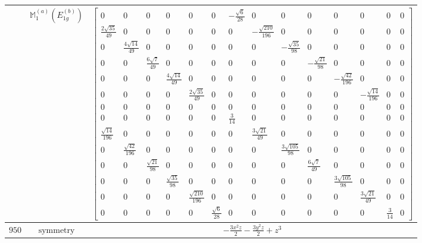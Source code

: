 \documentclass[fleqn,8pt,landscape]{jsarticle}
\begin{document}
\begin{longtable}{ccc}
$  $ & $ \mathbb{M}_{1}^{(a)}(E_{1g}^{(b)}) $ & $ \begin{bmatrix} 0 & 0 & 0 & 0 & 0 & 0 & - \frac{\sqrt{6}}{28} & 0 & 0 & 0 & 0 & 0 & 0 & 0 \\ \frac{2 \sqrt{35}}{49} & 0 & 0 & 0 & 0 & 0 & 0 & - \frac{\sqrt{210}}{196} & 0 & 0 & 0 & 0 & 0 & 0 \\ 0 & \frac{4 \sqrt{14}}{49} & 0 & 0 & 0 & 0 & 0 & 0 & - \frac{\sqrt{35}}{98} & 0 & 0 & 0 & 0 & 0 \\ 0 & 0 & \frac{6 \sqrt{7}}{49} & 0 & 0 & 0 & 0 & 0 & 0 & - \frac{\sqrt{21}}{98} & 0 & 0 & 0 & 0 \\ 0 & 0 & 0 & \frac{4 \sqrt{14}}{49} & 0 & 0 & 0 & 0 & 0 & 0 & - \frac{\sqrt{42}}{196} & 0 & 0 & 0 \\ 0 & 0 & 0 & 0 & \frac{2 \sqrt{35}}{49} & 0 & 0 & 0 & 0 & 0 & 0 & - \frac{\sqrt{14}}{196} & 0 & 0 \\ 0 & 0 & 0 & 0 & 0 & 0 & 0 & 0 & 0 & 0 & 0 & 0 & 0 & 0 \\ 0 & 0 & 0 & 0 & 0 & 0 & \frac{3}{14} & 0 & 0 & 0 & 0 & 0 & 0 & 0 \\ \frac{\sqrt{14}}{196} & 0 & 0 & 0 & 0 & 0 & 0 & \frac{3 \sqrt{21}}{49} & 0 & 0 & 0 & 0 & 0 & 0 \\ 0 & \frac{\sqrt{42}}{196} & 0 & 0 & 0 & 0 & 0 & 0 & \frac{3 \sqrt{105}}{98} & 0 & 0 & 0 & 0 & 0 \\ 0 & 0 & \frac{\sqrt{21}}{98} & 0 & 0 & 0 & 0 & 0 & 0 & \frac{6 \sqrt{7}}{49} & 0 & 0 & 0 & 0 \\ 0 & 0 & 0 & \frac{\sqrt{35}}{98} & 0 & 0 & 0 & 0 & 0 & 0 & \frac{3 \sqrt{105}}{98} & 0 & 0 & 0 \\ 0 & 0 & 0 & 0 & \frac{\sqrt{210}}{196} & 0 & 0 & 0 & 0 & 0 & 0 & \frac{3 \sqrt{21}}{49} & 0 & 0 \\ 0 & 0 & 0 & 0 & 0 & \frac{\sqrt{6}}{28} & 0 & 0 & 0 & 0 & 0 & 0 & \frac{3}{14} & 0 \end{bmatrix} $ \\ \hline
$ 950 $ & $ \text{symmetry} $ & $ - \frac{3 x^{2} z}{2} - \frac{3 y^{2} z}{2} + z^{3} $ \\

\end{longtable}
\end{document}
